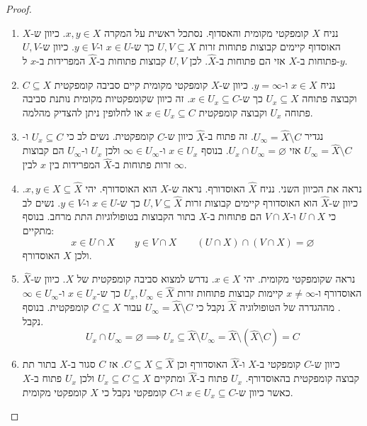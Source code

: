 \documentclass{tstextbook}
\begin{document}
\begin{proof}
  \begin{enumerate}
    \item נניח \(X\) קומפקטי מקומית והאסדוף. נסתכל ראשית על המקרה \(x,y \in X\). כיוון ש-\(X\) האוסדוף קיימים קבוצות פתוחות זרות \(U,V\subseteq X\) כך ש-\(x \in U\) ו-\(y \in V\). כיוון ש-\(U,V\) פתוחות ב-\(X\) אזי הם פתוחות ב-\(\hat{X}\). לכן \(U,V\) קבוצות פתוחות ב-\(\hat{X}\) המפרידות ב-\(x\) ל-\(y\). 


    \item נניח \(x \in X\) ו-\(y = \infty\). כיוון ש-\(X\) קומפקטי מקומית קיים סביבה קומפקטית \(C \subseteq X\) וקבוצה פתוחה \(U_{x}\subseteq X\) כך ש-\(x \in U_{x} \subseteq C\). זה כיוון שקומפקטיות מקומית נותנת סביבה פתוחה \(U_{x}\) וקבוצה קומפקטית \(x \in U_{x}\subseteq C\) או לחלופין ניתן להצדיק מהלמה. 


    \item נגדיר \(U_{\infty}=\hat{X} \setminus C\). זה פתוח ב-\(\hat{X}\) כיוון ש-\(C\) קומפקטית. נשים לב כי \(U_{x}\subseteq C\) ו-\(U_{\infty}=\hat{X}\setminus C\) אזי \(U_{x}\cap U_{\infty}=\varnothing\). בנוסף \(x \in U_{x}\) ו-\(\infty \in U_{\infty}\) ולכן \(U_{x}\) ו-\(U_{\infty}\) הם קבוצות זרות פתוחות ב-\(\hat{X}\) המפרידות בין \(x\) לבין \(\infty\). 


    \item נראה את הכיוון השני. נניח \(\hat{X}\) האוסדורף. נראה ש-\(X\) הוא האוסדורף. יהי \(x,y \in X\subseteq \hat{X}\). כיוון ש-\(\hat{X}\) הוא האוסדורף קיימים קבוצות זרות \(U,V\subseteq \hat{X}\) כך ש-\(x \in U\) ו-\(y \in V\). נשים לב כי \(U\cap X\) ו-\(V \cap X\) הם פתוחות ב-\(X\) בתור הקבוצות בטופולוגיות התת מרחב. בנוסף מתקיים: 
$$x \in U\cap X\qquad  y \in V \cap X\qquad \left(U\cap X\right)\cap\left(V\cap X\right)=\varnothing $$
ולכן \(X\) האוסדורף.


    \item נראה שקומפקטי מקומית. יהי \(x \in X\). נדרש למצוא סביבה קומפקטית של \(X\). כיוון ש-\(\hat{X}\) האוסדורף ו-\(x \neq \infty\) קיימות קבוצות פתוחות זרות \(U_{x},U_{\infty}\in \hat{X}\) כך ש-\(x \in U_{x}\) ו-\(\infty \in U_{\infty}\). מההגדרה של הטופולוגיה \(\hat{X}\) נקבל כי \(U_{\infty}=\hat{X}\setminus C\) עבור \(C\subseteq X\) קומפקטית. בנוסף נקבל. 
$$U_{x}\cap U_{\infty}=\varnothing\implies U_{x}\subseteq\hat{X}\setminus U_{\infty}=\hat{X}\setminus(\hat{X}\setminus C)=C$$


    \item כיוון ש-\(C\) קומפקטי ב-\(X\) ו-\(\hat{X}\) האוסדורף וכן \(C\subseteq X\subseteq \hat{X}\). אז \(C\) סגור ב-\(X\) בתור תת קבוצה קומפקטית בהאוסדורף. \(U_{x}\) פתוח ב-\(\hat{X}\) ומתקיים \(U_{x}\subseteq C\subseteq X\) ולכן \(U_{x}\) פתוח ב-\(X\) כאשר כיוון ש-\(x \in U_{x}\subseteq C\) ו-\(C\) קומפקטי נקבל כי \(X\) קומפקטי מקומית. 


  \end{enumerate}
\end{proof}
\end{document}
